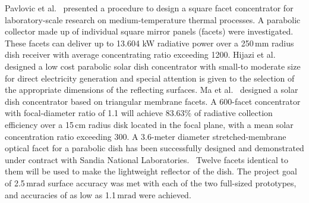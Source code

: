 Pavlovic et al.~\cite{Pavlovic2014} presented a procedure to design a square facet concentrator for laboratory-scale research on medium-temperature thermal processes. A parabolic collector made up of individual square mirror panels (facets) were investigated. These facets can deliver up to 13.604 kW radiative power over a 250$\,\mathrm{mm}$ radius dish receiver with average concentrating ratio exceeding 1200.
Hijazi et al.~\cite{Hijazi2016} designed a low cost parabolic solar dish concentrator with small-to moderate size for direct electricity generation and special attention is given to the selection of the appropriate dimensions of the reflecting surfaces.
Ma et al.~\cite{Ma2012} designed a solar dish concentrator based on triangular membrane facets. A 600-facet concentrator with focal-diameter ratio of 1.1 will achieve 83.63\% of radiative collection efficiency over a 15$\,\mathrm{cm}$ radius disk located in the focal plane, with a mean solar concentration ratio exceeding 300.
A 3.6-meter diameter stretched-membrane optical facet for a parabolic dish has been successfully designed and demonstrated under contract with Sandia National Laboratories.~\cite{Schertz1991} Twelve facets identical to them will be used to make the lightweight reflector of the dish. The project goal of 2.5$\,\mathrm{mrad}$ surface accuracy was met with each of the two full-sized prototypes, and accuracies of as low as 1.1$\,\mathrm{mrad}$ were achieved.

